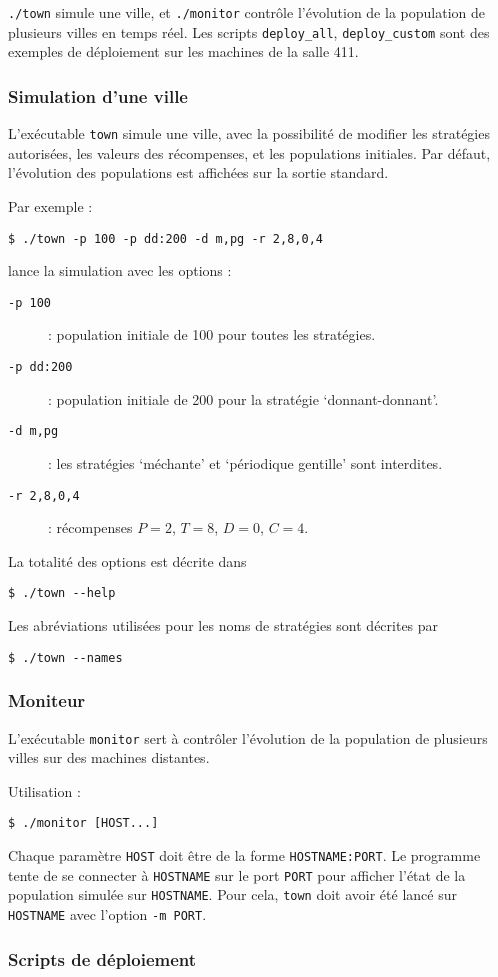 \documentclass[10pt]{article}
\begin{document}
\verb|./town| simule une ville, et \verb|./monitor| contrôle l'évolution de la population de plusieurs villes en temps réel.
Les scripts \verb|deploy_all|, \verb|deploy_custom| sont des exemples de déploiement sur les machines de la salle 411.

\subsubsection{Simulation d'une ville}
L'exécutable \verb|town| simule une ville, avec la possibilité de modifier les stratégies autorisées,
les valeurs des récompenses, et les populations initiales. Par défaut, l'évolution des populations
est affichées sur la sortie standard.

Par exemple :
\begin{verbatim}
$ ./town -p 100 -p dd:200 -d m,pg -r 2,8,0,4
\end{verbatim}
lance la simulation avec les options :
\begin{description}
\item[\tt{-p 100}] : population initiale de 100 pour toutes les stratégies.
\item[\tt{-p dd:200}] : population initiale de 200 pour la stratégie `donnant-donnant'.
\item[\tt{-d m,pg}] : les stratégies `méchante' et `périodique gentille' sont interdites.
\item[\tt{-r 2,8,0,4}] : récompenses $P=2$, $T=8$, $D=0$, $C=4$.
\end{description}

La totalité des options est décrite dans
\begin{verbatim}
$ ./town --help
\end{verbatim}

Les abréviations utilisées pour les noms de stratégies sont décrites par
\begin{verbatim}
$ ./town --names
\end{verbatim}

\subsubsection{Moniteur}
L'exécutable \verb|monitor| sert à contrôler l'évolution de la population de plusieurs villes sur des machines distantes.

Utilisation :
\begin{verbatim}
$ ./monitor [HOST...]
\end{verbatim}
Chaque paramètre \verb|HOST| doit être de la forme \verb|HOSTNAME:PORT|.
Le programme tente de se connecter à \verb|HOSTNAME| sur le port \verb|PORT| pour afficher l'état de la population simulée sur \verb|HOSTNAME|.
Pour cela, \verb|town| doit avoir été lancé sur \verb|HOSTNAME| avec l'option \verb|-m PORT|.

\subsubsection{Scripts de déploiement}
\end{document}
